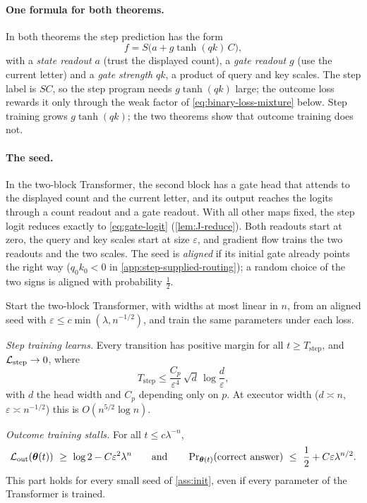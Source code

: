 \paragraph{One formula for both theorems.} In both theorems the step prediction has the form
\begin{equation}
 f=S\bigl(a+g\tanh(qk)\,C\bigr),
 \label{eq:gate-logit}
\end{equation}
with a \emph{state readout} $a$ (trust the displayed count), a \emph{gate readout} $g$ (use the current letter) and a
\emph{gate strength} $qk$, a product of query and key scales. The step label is $SC$, so the step program needs
$g\tanh(qk)$ large; the outcome loss rewards it only through the weak factor of \cref{eq:binary-loss-mixture} below.
Step training grows $g\tanh(qk)$; the two theorems show that outcome training does not.

\paragraph{The seed.} In the two-block Transformer, the second block has a gate head that attends to the displayed count
and the current letter, and its output reaches the logits through a count readout and a gate readout. With all other
maps fixed, the step logit reduces exactly to \cref{eq:gate-logit} (\cref{lem:J-reduce}). Both readouts start at zero, the
query and key scales start at size $\varepsilon$, and gradient flow trains the two readouts and the two scales. The seed is
\emph{aligned} if its initial gate already points the right way ($q_0k_0<0$ in \cref{app:step-supplied-routing}); a random choice
of the two signs is aligned with probability $\frac12$.

\begin{theorem}
\label{thm:time}
Start the two-block Transformer, with widths at most linear in $n$, from an aligned seed with $\varepsilon\le c\min(\lambda,n^{-1/2})$,
and train the same parameters under each loss.
\begin{thmparts}
\item\label{thm:joint} \emph{Step training learns.} Every transition has positive margin for all $t\ge T_{\mathrm{step}}$, and $\mathcal L_{\mathrm{step}}\to0$, where
\[
 T_{\mathrm{step}}\le\frac{C_p}{\varepsilon^4}\,\sqrt{d}\,\log\frac{d}{\varepsilon},
\]
with $d$ the head width and $C_p$ depending only on $p$. At executor width ($d\asymp n$,
$\varepsilon\asymp n^{-1/2}$) this is $O(n^{5/2}\log n)$.
\item\label{thm:outcome-end} \emph{Outcome training stalls.} For all $t\le c\lambda^{-n}$,
\[
 \Lout(\bm\theta(t))\ \ge\ \log2-C\varepsilon^2\lambda^n
 \qquad\text{and}\qquad
 \Pr\nolimits_{\bm\theta(t)}(\text{correct answer})\ \le\ \tfrac12+C\varepsilon\lambda^{n/2}.
\]
This part holds for every small seed of \cref{ass:init}, even if every parameter of the Transformer is trained.
\end{thmparts}
\end{theorem}

